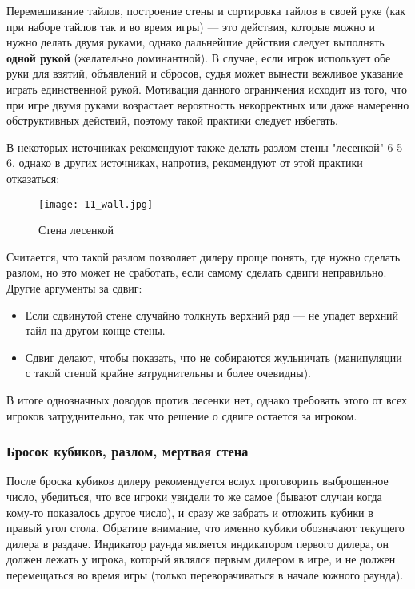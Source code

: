 Перемешивание тайлов, построение стены и сортировка тайлов в своей руке (как при наборе тайлов так и во время игры) --- это действия, которые можно и нужно делать двумя руками, однако дальнейшие действия следует выполнять \textbf{одной рукой} (желательно доминантной). В случае, если игрок использует обе руки для взятий, объявлений и сбросов, судья может вынести вежливое указание играть единственной рукой. Мотивация данного ограничения исходит из того, что при игре двумя руками возрастает вероятность некорректных или даже намеренно обструктивных действий, поэтому такой практики следует избегать.

\newpage

В некоторых источниках рекомендуют также делать разлом стены "лесенкой" 6-5-6, однако в других источниках, напротив, рекомендуют от этой практики отказаться:

\begin{figure}[H]
	\centering
	\texttt{[image: 11\_wall.jpg]}
	\caption{Стена лесенкой}
\end{figure}

Считается, что такой разлом позволяет дилеру проще понять, где нужно сделать разлом, но это может не сработать, если самому сделать сдвиги неправильно. Другие аргументы за сдвиг:
\begin{itemize}
	\item Если сдвинутой стене случайно толкнуть верхний ряд --- не упадет верхний тайл на другом конце стены.
	\item Сдвиг делают, чтобы показать, что не собираются жульничать (манипуляции с такой стеной крайне затруднительны и  более очевидны).
\end{itemize} 
В итоге однозначных доводов против лесенки нет, однако требовать этого от всех игроков затруднительно, так что решение о сдвиге остается за игроком.

\subsubsection{Бросок кубиков, разлом, мертвая стена}

После броска кубиков дилеру рекомендуется вслух проговорить выброшенное число, убедиться, что все игроки увидели то же самое (бывают случаи когда кому-то показалось другое число), и сразу же забрать и отложить кубики в правый угол стола. Обратите внимание, что именно кубики обозначают текущего дилера в раздаче. Индикатор раунда является индикатором первого дилера, он должен лежать у игрока, который являлся первым дилером в игре, и не должен перемещаться во время игры (только переворачиваться в начале южного раунда).

